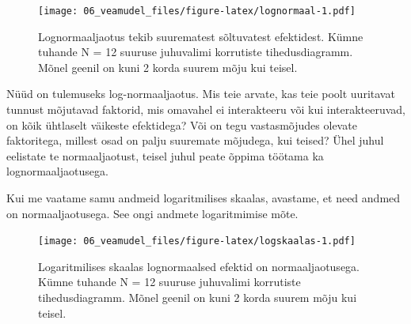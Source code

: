 \documentclass[]{book}
\newenvironment{Shaded}{\begin{snugshade}}{\end{snugshade}}
\newcommand{\KeywordTok}[1]{\textcolor[rgb]{0.13,0.29,0.53}{\textbf{#1}}}
\newcommand{\DataTypeTok}[1]{\textcolor[rgb]{0.13,0.29,0.53}{#1}}
\newcommand{\DecValTok}[1]{\textcolor[rgb]{0.00,0.00,0.81}{#1}}
\newcommand{\StringTok}[1]{\textcolor[rgb]{0.31,0.60,0.02}{#1}}
\newcommand{\OperatorTok}[1]{\textcolor[rgb]{0.81,0.36,0.00}{\textbf{#1}}}
\newcommand{\NormalTok}[1]{#1}
\begin{document}
\begin{Shaded}
\end{Shaded}

\begin{figure}
\centering
\texttt{[image: 06\_veamudel\_files/figure-latex/lognormaal-1.pdf]}
\caption{\label{fig:lognormaal}Lognormaaljaotus tekib suurematest sõltuvatest
efektidest. Kümne tuhande N = 12 suuruse juhuvalimi korrutiste
tihedusdiagramm. Mõnel geenil on kuni 2 korda suurem mõju kui teisel.}
\end{figure}

Nüüd on tulemuseks log-normaaljaotus. Mis teie arvate, kas teie poolt
uuritavat tunnust mõjutavad faktorid, mis omavahel ei interakteeru või
kui interakteeruvad, on kõik ühtlaselt väikeste efektidega? Või on tegu
vastasmõjudes olevate faktoritega, millest osad on palju suuremate
mõjudega, kui teised? Ühel juhul eelistate te normaaljaotust, teisel
juhul peate õppima töötama ka lognormaaljaotusega.

Kui me vaatame samu andmeid logaritmilises skaalas, avastame, et need
andmed on normaaljaotusega. See ongi andmete logaritmimise mõte.





\begin{Shaded}
\end{Shaded}

\begin{figure}
\centering
\texttt{[image: 06\_veamudel\_files/figure-latex/logskaalas-1.pdf]}
\caption{\label{fig:logskaalas}Logaritmilises skaalas lognormaalsed efektid on
normaaljaotusega. Kümne tuhande N = 12 suuruse juhuvalimi korrutiste
tihedusdiagramm. Mõnel geenil on kuni 2 korda suurem mõju kui teisel.}
\end{figure}
\end{document}
